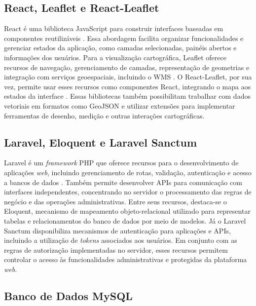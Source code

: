 \subsection{React, Leaflet e React-Leaflet}
\label{sec:frontend-tecnologias}

React é uma biblioteca JavaScript para construir interfaces baseadas em componentes reutilizáveis \cite{ReactDocs}. Essa abordagem facilita organizar funcionalidades e gerenciar estados da aplicação, como camadas selecionadas, painéis abertos e informações dos usuários. Para a visualização cartográfica, Leaflet oferece recursos de navegação, gerenciamento de camadas, representação de geometrias e integração com serviços geoespaciais, incluindo o \gls{WMS} \cite{LeafletDocs}. O React-Leaflet, por sua vez, permite usar esses recursos como componentes React, integrando o mapa aos estados da interface \cite{ReactLeafletDocs}. Essas bibliotecas também possibilitam trabalhar com dados vetoriais em formatos como GeoJSON e utilizar extensões para implementar ferramentas de desenho, medição e outras interações cartográficas.

\subsection{Laravel, Eloquent e Laravel Sanctum}
\label{sec:backend-tecnologias}

Laravel é um \textit{framework} PHP que oferece recursos para o desenvolvimento de aplicações \textit{web}, incluindo gerenciamento de rotas, validação, autenticação e acesso a bancos de dados \cite{LaravelDocs8}. Também permite desenvolver APIs para comunicação com interfaces independentes, concentrando no servidor o processamento das regras de negócio e das operações administrativas. Entre seus recursos, destaca-se o Eloquent, mecanismo de mapeamento objeto-relacional utilizado para representar tabelas e relacionamentos do banco de dados por meio de modelos. Já o Laravel Sanctum disponibiliza mecanismos de autenticação para aplicações e APIs, incluindo a utilização de \textit{tokens} associados aos usuários. Em conjunto com as regras de autorização implementadas no servidor, esses recursos permitem controlar o acesso às funcionalidades administrativas e protegidas da plataforma \textit{web}.

\subsection{Banco de Dados MySQL}
\label{sec:mysql}

